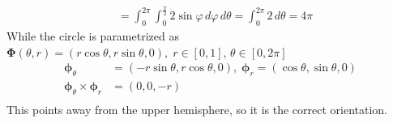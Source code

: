 \documentclass{article}
\begin{document}
\begin{enumerate}
\begin{align*}
                &= \int_0^{2\pi} \int_0^{\frac{\pi}{2}} 2\sin \varphi \, d\varphi \, d\theta = \int_0^{2\pi} 2\, d\theta  = 4 \pi
                \end{align*}
                While the circle is parametrized as $\boldsymbol \Phi (\theta, r) = (r\cos \theta, r\sin \theta, 0),\; r \in [0,1],\, \theta \in [0,2\pi]$
                \begin{align*}
                \boldsymbol \phi_{\theta} &= (-r\sin \theta, r\cos \theta, 0) ,\; \boldsymbol \phi_{r} = (\cos\theta, \sin\theta, 0)\\
                \boldsymbol \phi_\theta \times \boldsymbol \phi_r &= (0,0,-r) \\ 
                \end{align*} 
                This points away from the upper hemisphere, so it is the correct orientation.


\end{enumerate}
\end{document}
